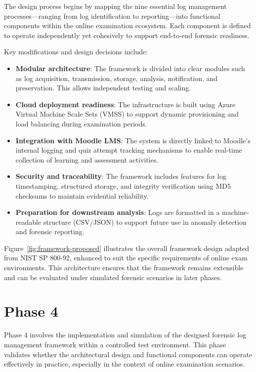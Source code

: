 The design process begins by mapping the nine essential log management processes—ranging from log identification to reporting—into functional components within the online examination ecosystem. Each component is defined to operate independently yet cohesively to support end-to-end forensic readiness.

Key modifications and design decisions include:

\begin{itemize}
	\item \textbf{Modular architecture}: The framework is divided into clear modules such as log acquisition, transmission, storage, analysis, notification, and preservation. This allows independent testing and scaling.
	
	\item \textbf{Cloud deployment readiness}: The infrastructure is built using Azure Virtual Machine Scale Sets (VMSS) to support dynamic provisioning and load balancing during examination periods.
	
	\item \textbf{Integration with Moodle LMS}: The system is directly linked to Moodle’s internal logging and quiz attempt tracking mechanisms to enable real-time collection of learning and assessment activities.
	
	\item \textbf{Security and traceability}: The framework includes features for log timestamping, structured storage, and integrity verification using MD5 checksums to maintain evidential reliability.
	
	\item \textbf{Preparation for downstream analysis}: Logs are formatted in a machine-readable structure (CSV/JSON) to support future use in anomaly detection and forensic reporting.
\end{itemize}

Figure~\ref{fig:framework-proposed} illustrates the overall framework design adapted from NIST SP 800-92, enhanced to suit the specific requirements of online exam environments. This architecture ensures that the framework remains extensible and can be evaluated under simulated forensic scenarios in later phases.

\section{Phase 4}
Phase 4 involves the implementation and simulation of the designed forensic log management framework within a controlled test environment. This phase validates whether the architectural design and functional components can operate effectively in practice, especially in the context of online examination scenarios.

